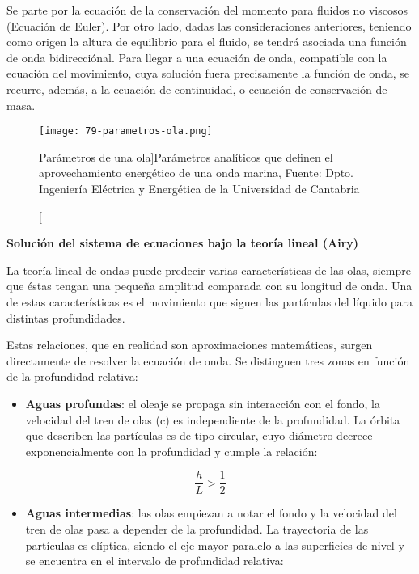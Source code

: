 Se parte por la ecuación de la conservación del momento para fluidos no
viscosos (Ecuación de Euler). Por otro lado, dadas las consideraciones
anteriores, teniendo como origen la altura de equilibrio para el fluido,
se tendrá asociada una función de onda bidirecciónal. Para llegar a una
ecuación de onda, compatible con la ecuación del movimiento, cuya
solución fuera precisamente la función de onda, se recurre, además, a la
ecuación de continuidad, o ecuación de conservación de masa.\\

\begin{figure}
\centering
\texttt{[image: 79-parametros-ola.png]}
\caption[Parámetros de una ola][Parámetros de una ola]{Parámetros analíticos que definen el aprovechamiento energético de una onda marina, Fuente: Dpto. Ingeniería Eléctrica y
Energética de la Universidad de Cantabria}
\label{fig:parametros}
\end{figure}

\textbf{Solución del sistema de ecuaciones bajo la teoría
lineal (Airy)}

La teoría lineal de ondas puede predecir varias características de las
olas, siempre que éstas tengan una pequeña amplitud comparada con su
longitud de onda. Una de estas características es el movimiento que
siguen las partículas del líquido para distintas profundidades.

Estas relaciones, que en realidad son aproximaciones matemáticas, surgen
directamente de resolver la ecuación de onda. Se distinguen tres zonas
en función de la profundidad relativa:

\begin{itemize}
\item
  \textbf{Aguas profundas}: el oleaje se propaga sin interacción con el
  fondo, la velocidad del tren de olas (c) es independiente de la
  profundidad. La órbita que describen las partículas es de tipo
  circular, cuyo diámetro decrece exponencialmente con la profundidad y
  cumple la relación:
\end{itemize}

\[\frac{h}{L}>\frac{1}{2}\]

\begin{itemize}
\item
  \textbf{Aguas intermedias}: las olas empiezan a notar el fondo y la
  velocidad del tren de olas pasa a depender de la profundidad. La
  trayectoria de las partículas es elíptica, siendo el eje mayor
  paralelo a las superficies de nivel y se encuentra en el intervalo de
  profundidad relativa:
\end{itemize}

